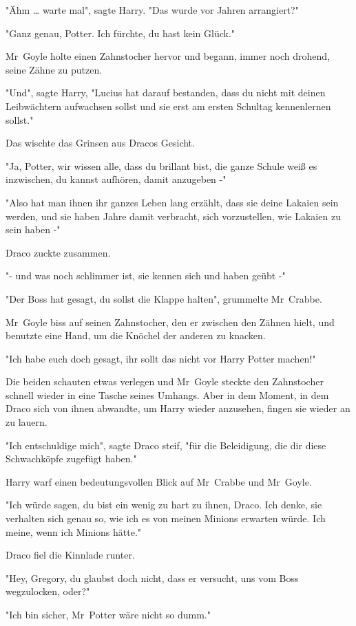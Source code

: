 {"Ähm … warte mal", sagte Harry. "Das wurde vor Jahren arrangiert?"

"Ganz genau, Potter. Ich fürchte, du hast kein Glück."

Mr~Goyle holte einen Zahnstocher hervor und begann, immer noch drohend, seine Zähne zu putzen.

"Und", sagte Harry, "Lucius hat darauf bestanden, dass du nicht mit deinen Leibwächtern aufwachsen sollst und sie erst am ersten Schultag kennenlernen sollst."

Das wischte das Grinsen aus Dracos Gesicht.

"Ja, Potter, wir wissen alle, dass du brillant bist, die ganze Schule weiß es inzwischen, du kannst aufhören, damit anzugeben -"

"Also hat man ihnen ihr ganzes Leben lang erzählt, dass sie deine Lakaien sein werden, und sie haben Jahre damit verbracht, sich vorzustellen, wie Lakaien zu sein haben -"

Draco zuckte zusammen.

"- und was noch schlimmer ist, sie kennen sich und haben geübt -"

"Der Boss hat gesagt, du sollst die Klappe halten", grummelte Mr~Crabbe.

Mr~Goyle biss auf seinen Zahnstocher, den er zwischen den Zähnen hielt, und benutzte eine Hand, um die Knöchel der anderen zu knacken.

"Ich habe euch doch gesagt, ihr sollt das nicht vor Harry Potter machen!"

Die beiden schauten etwas verlegen und Mr~Goyle steckte den Zahnstocher schnell wieder in eine Tasche seines Umhangs. Aber in dem Moment, in dem Draco sich von ihnen abwandte, um Harry wieder anzusehen, fingen sie wieder an zu lauern.

"Ich entschuldige mich", sagte Draco steif, "für die Beleidigung, die dir diese Schwachköpfe zugefügt haben."

Harry warf einen bedeutungsvollen Blick auf Mr~Crabbe und Mr~Goyle.

"Ich würde sagen, du bist ein wenig zu hart zu ihnen, Draco. Ich denke, sie verhalten sich genau so, wie ich es von meinen Minions erwarten würde. Ich meine, wenn ich Minions hätte."

Draco fiel die Kinnlade runter.

"Hey, Gregory, du glaubst doch nicht, dass er versucht, uns vom Boss wegzulocken, oder?"

"Ich bin sicher, Mr~Potter wäre nicht so dumm."

}
